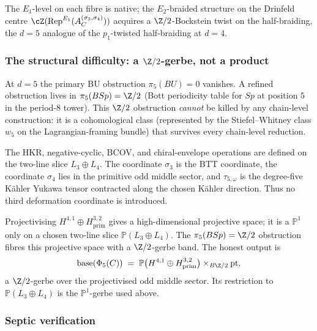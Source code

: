 The $E_1$-level on each fibre is native; the $E_2$-braided structure on the
Drinfeld centre $\cZ(\mathrm{Rep}^{E_1}(A^{(\sigma_3, \sigma_4)}_C))$ acquires a
$\Z/2$-Bockstein twist on the half-braiding, the $d = 5$ analogue of the
$p_1$-twisted half-braiding at $d = 4$.

\subsubsection{The structural difficulty: a \texorpdfstring{$\Z/2$}{Z/2}-gerbe, not a product}
\label{subsubsec:phi-5-structural-difficulty}

\begin{remark}[\texorpdfstring{$\pi_5(BSp) = \Z/2$}{pi-5(BSp) = Z/2} refined obstruction]
\label{rem:phi-5-pi-5-bsp}
At $d = 5$ the primary BU obstruction $\pi_5(BU) = 0$ vanishes. A refined
obstruction lives in $\pi_5(BSp) = \Z/2$ \textup{(}Bott periodicity table for
$Sp$ at position $5$ in the period-$8$ tower\textup{)}. This $\Z/2$ obstruction
\emph{cannot} be killed by any chain-level construction: it is a cohomological
class \textup{(}represented by the Stiefel--Whitney class $w_5$ on the
Lagrangian-framing bundle\textup{)} that survives every chain-level reduction.

The HKR, negative-cyclic, BCOV, and chiral-envelope operations are defined
on the two-line slice \(L_3\oplus L_4\). The coordinate \(\sigma_3\) is the
BTT coordinate, the coordinate \(\sigma_4\) lies in the primitive odd middle
sector, and \(\tau_{5,\omega}\) is the degree-five K\"ahler Yukawa tensor
contracted along the chosen K\"ahler direction. Thus no third deformation
coordinate is introduced.

Projectivising \(H^{4,1}\oplus
H^{3,2}_{\mathrm{prim}}\) gives a high-dimensional projective space; it
is a \(\mathbb P^1\) only on a chosen two-line slice
\(\mathbb P(L_3\oplus L_4)\). The \(\pi_5(BSp)=\Z/2\) obstruction fibres
this projective space with a \(\Z/2\)-gerbe band.
The honest output is
\[
 \mathrm{base}(\Phi_5(C)) \;=\; \mathbb{P}\bigl(H^{4,1} \oplus
 H^{3,2}_{\mathrm{prim}}\bigr) \times_{B\Z/2} \mathrm{pt},
\]
a $\Z/2$-gerbe over the projectivised odd middle sector. Its restriction
to \(\mathbb P(L_3\oplus L_4)\) is the \(\mathbb P^1\)-gerbe used above.
\end{remark}

\subsubsection{Septic verification}
\label{subsubsec:phi-5-septic}


